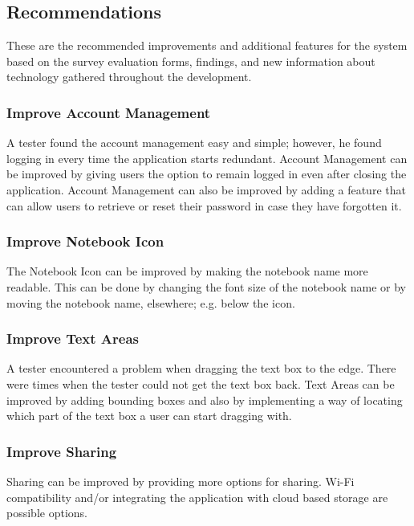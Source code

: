 \subsection{Recommendations}
\label{sec:recommendations}

These are the recommended improvements and additional features for the system based on the survey evaluation forms, findings, and new information about technology gathered throughout the development.

\subsubsection{Improve Account Management}
\label{sec:improveaccountmanagement}

A tester found the account management easy and simple; however, he found logging in every time the application starts redundant. Account Management can be improved by giving users the option to remain logged in even after closing the application. Account Management can also be improved by adding a feature that can allow users to retrieve or reset their password in case they have forgotten it.

\subsubsection{Improve Notebook Icon}
\label{sec:improvenotebookicon}

The Notebook Icon can be improved by making the notebook name more readable. This can be done by changing the font size of the notebook name or by moving the notebook name, elsewhere; e.g. below the icon.

\subsubsection{Improve Text Areas}
\label{sec:improvetextareas}

A tester encountered a problem when dragging the text box to the edge. There were times when the tester could not get the text box back. Text Areas can be improved by adding bounding boxes and also by implementing a way of locating which part of the text box a user can start dragging with.

\subsubsection{Improve Sharing}
\label{sec:improvesharing}

Sharing can be improved by providing more options for sharing. Wi-Fi compatibility and/or integrating the application with cloud based storage are possible options.

